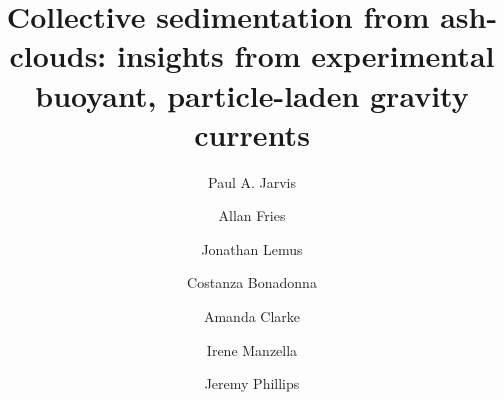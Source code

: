 \documentclass[authoryear,preprint,review,12pt]{elsarticle}
\begin{document}
\begin{frontmatter}



\title{Collective sedimentation from ash-clouds: insights from experimental buoyant, particle-laden gravity currents}


\author[label1, label2]{Paul A. Jarvis}
\author[label1]{Allan Fries}
\author[label1]{Jonathan Lemus}
\author[label1]{Costanza Bonadonna}
\author[label3]{Amanda Clarke}
\author[label4]{Irene Manzella}
\author[label5]{Jeremy Phillips}

\address[label1]{Department of Earth Sciences, University of Geneva, Rue des Mar{\"i}chers, Geneva, 1205, Switzerland}
\address[label2]{GNS Science, Wairakei Research Centre, 114 Karetoto Road, Taupo, 3377, New Zealand}
\address[label3]{School of Earth and Space Exploration, Arizona State University, ISTB4-BLDG75, 781 E Terrance Mall, Tempe, AZ, 85287-6004, USA}
\address[label4]{School of Geography, Earth and Envrionmental Sciences, Univeristy of Plymouth, Drake Circus, Plymouth, PL4 8AA, UK}
\address[label5]{School of Earth Sciences, University of Bristol, Wills Memorial Building, Queens Road, Bristol, BS8 1RJ, UK}

\begin{abstract}

\end{abstract}

\begin{graphicalabstract}
\end{graphicalabstract}


\end{frontmatter}
\end{document}
